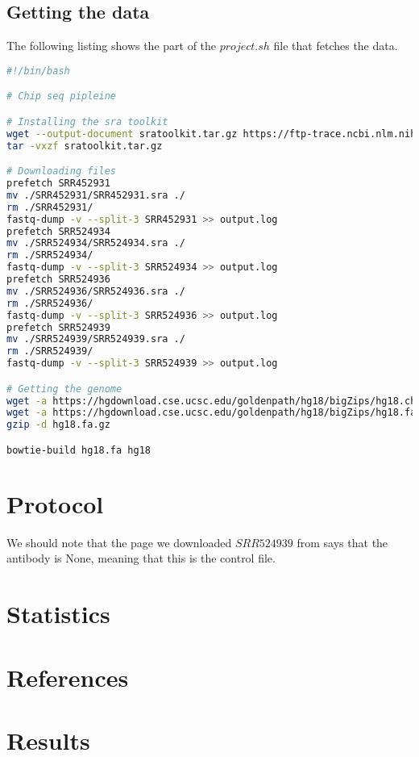 \documentclass[12pt, a4paper]{article}
\begin{document}
\subsection{Getting the data}

The following listing shows the part of the $project.sh$ file that fetches the data.

\begin{lstlisting}[language=bash, caption=Downloading the data]
#!/bin/bash

# Chip seq pipleine

# Installing the sra toolkit
wget --output-document sratoolkit.tar.gz https://ftp-trace.ncbi.nlm.nih.gov/sra/sdk/current/sratoolkit.current-ubuntu64.tar.gz
tar -vxzf sratoolkit.tar.gz

# Downloading files
prefetch SRR452931
mv ./SRR452931/SRR452931.sra ./
rm ./SRR452931/
fastq-dump -v --split-3 SRR452931 >> output.log
prefetch SRR524934
mv ./SRR524934/SRR524934.sra ./
rm ./SRR524934/
fastq-dump -v --split-3 SRR524934 >> output.log
prefetch SRR524936
mv ./SRR524936/SRR524936.sra ./
rm ./SRR524936/
fastq-dump -v --split-3 SRR524936 >> output.log
prefetch SRR524939
mv ./SRR524939/SRR524939.sra ./
rm ./SRR524939/
fastq-dump -v --split-3 SRR524939 >> output.log

# Getting the genome
wget -a https://hgdownload.cse.ucsc.edu/goldenpath/hg18/bigZips/hg18.chrom.sizes
wget -a https://hgdownload.cse.ucsc.edu/goldenpath/hg18/bigZips/hg18.fa.gz
gzip -d hg18.fa.gz

bowtie-build hg18.fa hg18
\end{lstlisting}

\section{Protocol}

We should note that the page we downloaded $SRR524939$ from says that the antibody is None, meaning that this is the control file.

\section{Statistics}

\section{References}

\section{Results}
\end{document}
